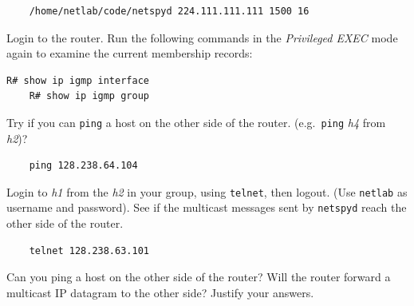 \documentclass{UTNetLab}
\begin{document}
    \begin{lstlisting}
	/home/netlab/code/netspyd 224.111.111.111 1500 16
    \end{lstlisting}
    
    Login to the router.
    Run the following commands in the \textit{Privileged EXEC} mode again to examine the current membership records:

    \begin{lstlisting}[language=cisco]
	R# show ip igmp interface
	R# show ip igmp group
    \end{lstlisting}

Try if you can \lstinline{ping} a host on the other side of the router.
(e.g.\ \lstinline{ping} \textit{h4} from \textit{h2})?

    \begin{lstlisting}
	ping 128.238.64.104
    \end{lstlisting}

Login to \textit{h1} from the \textit{h2} in your group, using  \lstinline{telnet}, then logout. (Use \texttt{netlab} as username and password). See if the multicast messages sent by \lstinline{netspyd} reach the other side of the router.

    \begin{lstlisting}
	telnet 128.238.63.101
    \end{lstlisting}
    
    
    \begin{report}
        \item Can you ping a host on the other side of the router?
            Will the router forward a multicast IP datagram to the other side? Justify your answers.
    \end{report}
\end{document}
